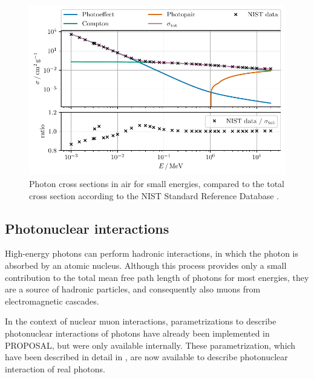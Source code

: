 \begin{figure}
	\centering
    \includegraphics{plots/photoeffect_nist.pdf}
    \caption{Photon cross sections in air for small energies, compared to the total cross section according to the NIST Standard Reference Database \cite{nist}.}
    \label{fig:photoeffect_nist}
\end{figure}

\subsection{Photonuclear interactions}

High-energy photons can perform hadronic interactions, in which the photon is absorbed by an atomic nucleus.
Although this process provides only a small contribution to the total mean free path length of photons for most energies, they are a source of hadronic particles, and consequently also muons from electromagnetic cascades.

In the context of nuclear muon interactions, parametrizations to describe photonuclear interactions of photons have already been implemented in PROPOSAL, but were only available internally.
These parametrization, which have been described in detail in \cite{KOEHNE20132070}, are now available to describe photonuclear interaction of real photons.

